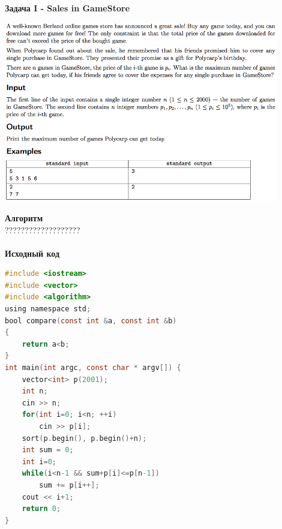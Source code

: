 \documentclass[a4paper,12pt]{article}
\begin{document}
\newpage
\textbf{{\large Задача I - Sales in GameStore}} \\
\begin{center}
\includegraphics[width=0.9\textwidth]{CT_ACM_WEST/CT_ACM_WEST_I.png}\\ [1cm]
\end{center}
\textbf{{\large Алгоритм}} \\
{\Huge ???????????????????} \\ 
\\
\newpage
\textbf{{\large Исходный код}}
\begin{lstlisting}[language=C]
#include <iostream>
#include <vector>
#include <algorithm>
using namespace std;
bool compare(const int &a, const int &b)
{
    return a<b;
}
int main(int argc, const char * argv[]) {
    vector<int> p(2001);
    int n;
    cin >> n;
    for(int i=0; i<n; ++i)
        cin >> p[i];
    sort(p.begin(), p.begin()+n);
    int sum = 0;
    int i=0;
    while(i<n-1 && sum+p[i]<=p[n-1])
        sum += p[i++];
    cout << i+1;
    return 0;
}
\end{lstlisting}
\end{document}
